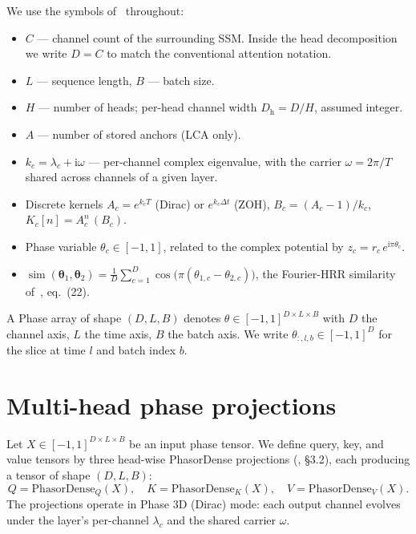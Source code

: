\documentclass[11pt]{article}
\newcommand{\im}{\mathrm{i}}
\newcommand{\dt}{\Delta t}
\newcommand{\nh}{H}              %
\newcommand{\Dh}{D_{\mathrm{h}}} %
\newcommand{\sm}{\operatorname{sim}}
\theoremstyle{definition}
\begin{document}
We use the symbols of~\cite{phasor-ssm-derivation} throughout:
\begin{itemize}[nosep,leftmargin=*]
  \item $C$ --- channel count of the surrounding SSM. Inside the
        head decomposition we write $D = C$ to match the conventional
        attention notation.
  \item $L$ --- sequence length, $B$ --- batch size.
  \item $\nh$ --- number of heads; per-head channel width
        $\Dh = D/\nh$, assumed integer.
  \item $A$ --- number of stored anchors (LCA only).
  \item $k_c = \lambda_c + \im\omega$ --- per-channel complex
        eigenvalue, with the carrier $\omega = 2\pi/T$ shared across
        channels of a given layer.
  \item Discrete kernels $A_c = e^{k_c T}$ (Dirac) or $e^{k_c\dt}$
        (ZOH), $B_c = (A_c-1)/k_c$, $K_c[n] = A_c^n\,(B_c)$.
  \item Phase variable $\theta_c\in[-1,1]$, related to the complex
        potential by $z_c = r_c\,e^{\im\pi\theta_c}$.
  \item $\sm(\bm\theta_1,\bm\theta_2) = \tfrac{1}{D}\sum_{c=1}^{D}
        \cos\!\bigl(\pi(\theta_{1,c} - \theta_{2,c})\bigr)$, the
        Fourier-HRR similarity of~\cite{phasor-ssm-derivation}, eq.~(22).
\end{itemize}

A Phase array of shape $(D, L, B)$ denotes
$\theta\in[-1,1]^{D\times L\times B}$ with $D$ the channel axis, $L$
the time axis, $B$ the batch axis. We write
$\theta_{:, l, b}\in[-1,1]^D$ for the slice at time $l$ and batch
index $b$.

\section{Multi-head phase projections}\label{sec:multihead}

Let $X\in[-1,1]^{D\times L\times B}$ be an input phase tensor. We
define query, key, and value tensors by three head-wise PhasorDense
projections (\cite{phasor-ssm-derivation}, \S3.2), each producing a
tensor of shape $(D, L, B)$:
\begin{equation}\label{eq:qkv-proj}
  Q = \mathrm{PhasorDense}_Q(X), \quad
  K = \mathrm{PhasorDense}_K(X), \quad
  V = \mathrm{PhasorDense}_V(X).
\end{equation}
The projections operate in Phase 3D (Dirac) mode: each output channel
evolves under the layer's per-channel $\lambda_c$ and the shared
carrier $\omega$.
\end{document}
